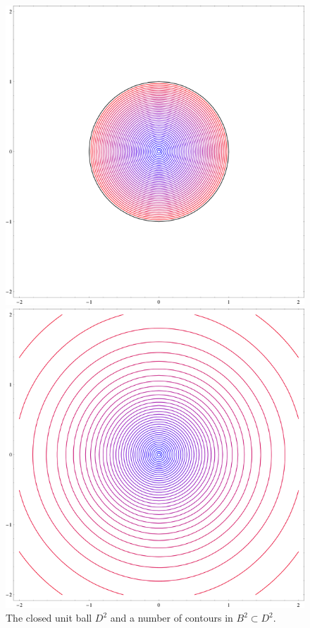 \begin{figure}
\centering
\begin{minipage}{.45\textwidth}
  \centering
  \includegraphics[width=\linewidth]{images/ball}
  \caption{The closed unit ball $D^2$ and a number of contours in $B^2\subset D^2$.}
  \label{ball}
\end{minipage}\hfill
\begin{minipage}{.45\textwidth}
  \centering
  \includegraphics[width=\linewidth]{images/plane}

\end{minipage}
\end{figure}
